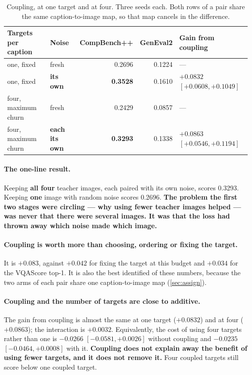 \documentclass[11pt]{article}
\newcommand{\obs}[1]{\textcolor{obsblue}{#1}}
\begin{document}
\begin{table}[h]
\centering
\caption{Coupling, at one target and at four. Three seeds each. Both rows of a pair share the same
caption-to-image map, so that map cancels in the difference.}
\label{tab:coupling}
\small
\begin{tabular}{@{}llrrl@{}}
\toprule
Targets per caption & Noise & CompBench++ & GenEval2 & Gain from coupling \\
\midrule
one, fixed & fresh & \obs{0.2696} & \obs{0.1224} & --- \\
one, fixed & \textbf{its own} & \obs{\textbf{0.3528}} & \obs{0.1610} & \obs{$+0.0832$ $[+0.0608,+0.1049]$} \\
four, maximum churn & fresh & \obs{0.2429} & \obs{0.0857} & --- \\
four, maximum churn & \textbf{each its own} & \obs{\textbf{0.3293}} & \obs{0.1338} & \obs{$+0.0863$ $[+0.0546,+0.1194]$} \\
\bottomrule
\end{tabular}
\end{table}

\paragraph{The one-line result.}
Keeping \textbf{all four} teacher images, each paired with its own noise, scores \obs{0.3293}.
Keeping \textbf{one} image with random noise scores \obs{0.2696}. \textbf{The problem the first
two stages were circling --- why using fewer teacher images helped --- was never that there were
several images. It was that the loss had thrown away which noise made which image.}

\paragraph{Coupling is worth more than choosing, ordering or fixing the target.}
It is \obs{$+0.083$}, against \obs{$+0.042$} for fixing the target at this budget and
\obs{$+0.034$} for the VQAScore top-1. It is also the best identified of these numbers, because the two
arms of each pair share one caption-to-image map (\cref{sec:assign}).

\paragraph{Coupling and the number of targets are close to additive.}
The gain from coupling is almost the same at one target (\obs{$+0.0832$}) and at four
(\obs{$+0.0863$}); the interaction is \obs{$+0.0032$}. Equivalently, the cost of using four targets
rather than one is \obs{$-0.0266$} $[-0.0581,+0.0026]$ without coupling and \obs{$-0.0235$}
$[-0.0464,+0.0008]$ with it. \textbf{Coupling does not explain away the benefit of using fewer
targets, and it does not remove it.} Four coupled targets still score below one coupled target.
\end{document}
